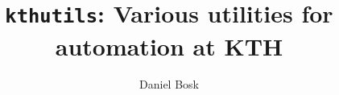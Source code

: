 \documentclass[a4paper,oneside]{memoir}
\title{%
  \texttt{kthutils}: Various utilities for automation at KTH
}
\author{%
  Daniel Bosk
}
\affil{%
  KTH EECS\\
  \texttt{dbosk@kth.se}
}
\begin{document}
\maketitle
\begin{abstract}
  
\end{abstract}

\clearpage
\vspace*{\fill}
\clearpage

\clearpage

\tableofcontents*
\clearpage









\printbibliography
\end{document}

